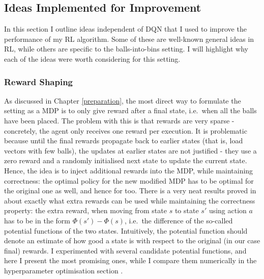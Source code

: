 \subsection{Ideas Implemented for Improvement} \label{improvementideas}


In this section I outline ideas independent of DQN that I used to improve the performance of my RL algorithm. Some of these are well-known general ideas in RL, while others are specific to the \TwoThinning balls-into-bins setting. I will highlight why each of the ideas were worth considering for this setting.


\subsubsection{Reward Shaping} \label{rewardshaping}

As discussed in Chapter \ref{preparation}, the most direct way to formulate the \TwoThinning setting as a MDP is to only give reward after a final state, i.e.\ when all the balls have been placed. The problem with this is that rewards are very sparse - concretely, the agent only receives one reward per execution. It is problematic because until the final rewards propagate back to earlier states (that is, load vectors with few balls), the updates at earlier states are not justified - they use a zero reward and a randomly initialised next state to update the current state. Hence, the idea is to inject additional rewards into the MDP, while maintaining correctness: the optimal policy for the new modified MDP has to be optimal for the original one as well, and hence for \TwoThinning too. There is a very neat results proved in \cite{ng1999rewardshaping} about exactly what extra rewards can be used while maintaining the correctness property: the extra reward, when moving from state $s$ to state $s'$ using action $a$ has to be in the form $\Phi(s')-\Phi(s)$, i.e.\ the difference of the so-called potential functions of the two states. Intuitively, the potential function should denote an estimate of how good a state is with respect to the original (in our case final) rewards. I experimented with several candidate potential functions, and here I present the most promising ones, while I compare them numerically in the hyperparameter optimisation section .

